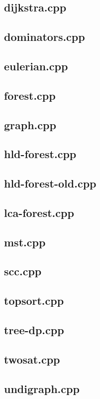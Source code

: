 \subsection{dijkstra.cpp}


\subsection{dominators.cpp}


\subsection{eulerian.cpp}


\subsection{forest.cpp}


\subsection{graph.cpp}


\subsection{hld-forest.cpp}


\subsection{hld-forest-old.cpp}


\subsection{lca-forest.cpp}


\subsection{mst.cpp}


\subsection{scc.cpp}


\subsection{topsort.cpp}


\subsection{tree-dp.cpp}


\subsection{twosat.cpp}


\subsection{undigraph.cpp}


